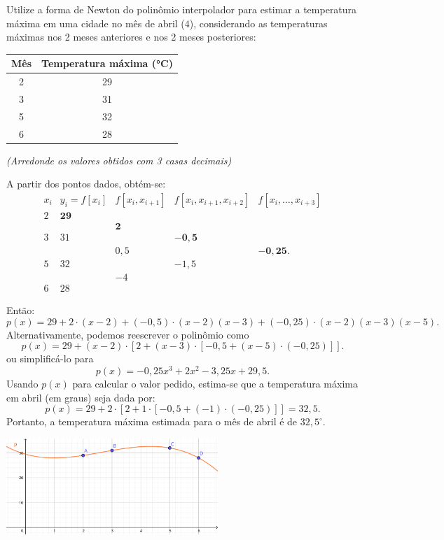 \documentclass[12pt,a4paper]{article}
\begin{document}
\begin{ExerciseList}
\Exercise[title={2,5}] Utilize a forma de Newton do polinômio interpolador para estimar a temperatura máxima em uma cidade no mês de abril (\(4\)), considerando as temperaturas máximas nos 2 meses anteriores e nos 2 meses posteriores:
\medskip
\begin{center}
\begin{tabular}{cc}
\hline
Mês & Temperatura máxima (°C) \\
\hline
2 & 29 \\
3 & 31 \\
5 & 32 \\
6 & 28 \\
\hline
\end{tabular}
\end{center}
\medskip
{\color{blue} \textit{(Arredonde os valores obtidos com 3 casas decimais)}}

\Answer A partir dos pontos dados, obtém-se:
\[
\begin{array}{ccccc}
x_i
& y_i=f[x_i]
& f[x_i,x_{i+1}]
& f[x_i,x_{i+1},x_{i+2}]
& f[x_i,\ldots,x_{i+3}]\\
2 & \mathbf{29} \\
        & & \mathbf{2} \\
3 & 31 & & \mathbf{-0,5} \\
        & & 0,5 & & \mathbf{-0,25}. \\
5 & 32 & & -1,5 \\
        & & -4 \\
6 & 28
\end{array}
\]

Então:
\[
p(x) = 29 + 2\cdot(x-2) + (-0,5)\cdot(x-2)(x-3) + (-0,25)\cdot(x-2)(x-3)(x-5).
\]
Alternativamente, podemos reescrever o polinômio como
\[
p(x) = 29 + (x-2)\cdot\left[2 + (x-3)\cdot\left[-0,5 + (x-5) \cdot (-0,25)\right]\right].
\]
ou simplificá-lo para
\[
p(x) = -0,25 x^3 + 2 x^2 - 3,25 x + 29,5.
\]
Usando $p(x)$ para calcular o valor pedido, estima-se que a temperatura máxima em abril (em graus) seja dada por:
\[
p(x)
= 29 + 2\cdot\left[2 + 1\cdot\left[-0,5 + (-1) \cdot (-0,25)\right]\right]
= 32,5.
\]
Portanto, a temperatura máxima estimada para o mês de abril é de $\boxed{32,5^\circ}$.
\begin{center}
\includegraphics[width=0.6\textwidth]{img/interpolação-diferenças-divididas-newton-temperaturas.pdf}
\end{center}


\end{ExerciseList}
\end{document}
